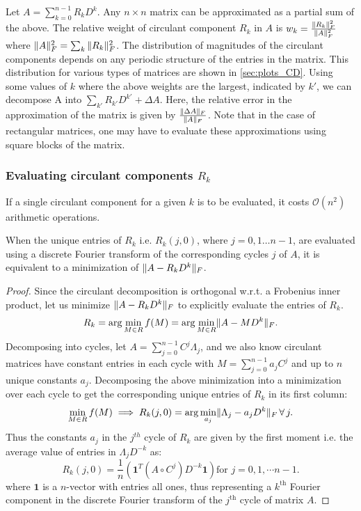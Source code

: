 \documentclass[onefignum,onetabnum]{siamart171218}
\DeclarePairedDelimiter\norm{\lVert}{\rVert}
\begin{document}
Let $A = \sum_{k = 0}^{n-1}R_kD^k$. Any $n \times n$ matrix can be approximated as a partial sum of the above. The relative weight of circulant component $R_k$ in $A$ is $w_k = \frac{\|R_k\|_F^2}{\norm{A}_F^2}$ where $\norm{A}_F^2=\sum_k \|R_k\|_F^2$. The distribution of magnitudes of the circulant components depends on any periodic structure of the entries in the matrix. This distribution for various types of matrices are shown in \cref{sec:plots_CD}. Using some values of $k$ where the above weights are the largest, indicated by $k'$, we can decompose A into $\sum_{k'} R_{k'} D^{k'} + \Delta A$. Here, the relative error in the approximation of the matrix is given by $\frac{\norm{\Delta A}_F}{\norm{A}_F}$. Note that in the case of rectangular matrices, one may have to evaluate these approximations using square blocks of the matrix.

\subsubsection{Evaluating circulant components $R_k$}

If a single circulant component for a given $k$ is to be evaluated, it costs $\mathcal{O}(n^2)$ arithmetic operations.

\begin{theorem}\label{th:fourier_circulant_entries}
When the unique entries of $R_k$ i.e. $R_{k}(j,0)$, where $j=0,1 \dots n-1$, are evaluated using a discrete Fourier transform of the corresponding cycles $j$ of $A$, it is equivalent to a minimization of $\norm{A-R_kD^k}_F$.
\end{theorem}

\begin{proof}
Since the circulant decomposition is orthogonal w.r.t. a Frobenius inner product, let us minimize $\norm{A-R_kD^{k}}_F$ to explicitly evaluate the entries of $R_k$.
\begin{equation*}\label{eq:norm_minimize}
   R_k = \arg \min_{M \in R} f(M) = \arg \min_{M \in R} \norm{A-MD^k}_F.    
\end{equation*}
Decomposing into cycles, let $A = \sum_{j=0}^{n-1} C^j \Lambda_j$, and we also know circulant matrices have constant entries in each cycle with $M = \sum_{j=0}^{n-1} a_jC^j$ and up to $n$ unique constants $a_j$. Decomposing the above minimization into a minimization over each cycle to get the corresponding unique entries of $R_k$ in its first column:
\begin{equation*}
\min_{M \in R} f(M) \implies R_k(j,0) = \arg \min_{a_j} \norm{\Lambda_j-a_jD^k}_F \,\forall\, j.
\end{equation*}
Thus the constants $a_j$ in the $j^{th}$ cycle of $R_k$ are given by the first moment i.e. the average value of entries in $\Lambda_jD^{-k}$ as:
\begin{equation*}
   R_{k}(j,0) = \frac{1}{n} \left( \mathbf{1}^T (A \circ C^{j})D^{-k} \mathbf{1} \right) \text{for } j = 0,1, \cdots n-1.
\end{equation*}
where $\mathbf{1}$ is a $n$-vector with entries all ones, thus representing a $k^{\text{th}}$ Fourier component in the discrete Fourier transform of the $j^{\text{th}}$ cycle of matrix $A$. 
\end{proof}
\end{document}
